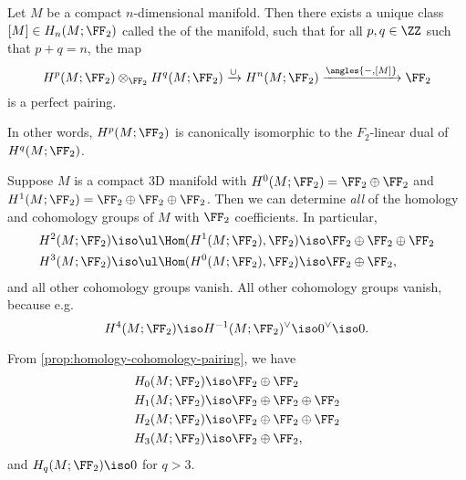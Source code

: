 \documentclass{standalone}
\begin{document}
\begin{theorem}
  Let \(M\) be a compact \(n\)-dimensional manifold.
  Then there exists a unique class \([M] \in H_n(M; \FF_2)\)
  called the  of the manifold, such that
  for all \(p, q \in \ZZ\) such that \(p + q = n\), the map
  \[
    H^p(M; \FF_2) \otimes_{\FF_2} H^q(M; \FF_2) \xrightarrow{\cup}
      H^n(M; \FF_2) \xrightarrow{\angles{{-}, [M]}} \FF_2
  \]
  is a perfect pairing.
\end{theorem}
In other words, \(H^p(M; \FF_2)\) is canonically isomorphic to
the \(F_2\)-linear dual of \(H^q(M; \FF_2)\).

\begin{example}
  Suppose \(M\) is a compact 3D manifold with
  \(H^0(M; \FF_2) = \FF_2 \oplus \FF_2\) and
  \(H^1(M; \FF_2) = \FF_2 \oplus \FF_2 \oplus \FF_2\).
  Then we can determine \emph{all} of
  the homology and cohomology groups of \(M\) with \(\FF_2\) coefficients.
  In particular,
  \begin{align*}
    H^2(M; \FF_2) &\iso \ul\Hom(H^1(M; \FF_2), \FF_2)
                   \iso \FF_2 \oplus \FF_2 \oplus \FF_2 \\
    H^3(M; \FF_2) &\iso \ul\Hom(H^0(M; \FF_2), \FF_2)
                   \iso \FF_2 \oplus \FF_2,
  \end{align*}
  and all other cohomology groups vanish.
  All other cohomology groups vanish, because e.g.\
  \[
    H^4(M; \FF_2) \iso H^{-1}(M; \FF_2)^\vee \iso 0^\vee \iso 0.
  \]

  From \cref{prop:homology-cohomology-pairing}, we have
  \begin{align*}
    H_0(M; \FF_2) &\iso \FF_2 \oplus \FF_2 \\
    H_1(M; \FF_2) &\iso \FF_2 \oplus \FF_2 \oplus \FF_2 \\
    H_2(M; \FF_2) &\iso \FF_2 \oplus \FF_2 \oplus \FF_2 \\
    H_3(M; \FF_2) &\iso \FF_2 \oplus \FF_2,
  \end{align*}
  and \(H_q(M; \FF_2) \iso 0\) for \(q > 3\).
\end{example}
\end{document}
